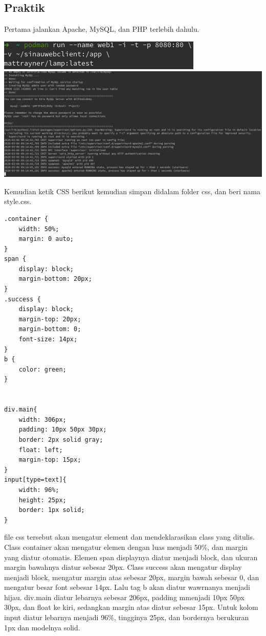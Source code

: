 \documentclass[a4paper,12pt]{article}
\begin{document}
\subsection{Praktik}
Pertama jalankan Apache, MySQL, dan PHP terlebih dahulu.
\begin{center}
    \includegraphics[scale=.8]{1.png}\\[4ex]
    \includegraphics[width=\linewidth]{2.png} 
\end{center}
Kemudian ketik CSS berikut kemudian simpan didalam folder css, dan beri nama style.css.
\begin{lstlisting}[style=htmlcssjs]
.container {
    width: 50%;
    margin: 0 auto;
}
span {
    display: block;
    margin-bottom: 20px;
}
.success {
    display: block;
    margin-top: 20px;
    margin-bottom: 0;
    font-size: 14px;
}
b {
    color: green;
}


div.main{
    width: 306px;
    padding: 10px 50px 30px;
    border: 2px solid gray;
    float: left;
    margin-top: 15px;
}
input[type=text]{
    width: 96%;
    height: 25px;
    border: 1px solid;
}
\end{lstlisting}
\newline
file css tersebut akan mengatur element dan mendeklarasikan class yang ditulis. Class container akan mengatur elemen dengan luas menjadi 50\%, dan margin yang diatur otomatis.
Elemen span displaynya diatur menjadi block, dan ukuran margin bawahnya diatur sebesar 20px.
Class success akan mengatur display menjadi block, mengatur margin atas sebesar 20px, margin bawah sebesar 0, dan mengatur besar font sebesar 14px.
Lalu tag b akan diatur wawrnanya menjadi hijau.
div.main diatur lebarnya sebesar 206px, padding mmenjadi 10px 50px 30px, dan float ke kiri, sedangkan margin atas diatur sebesar 15px.
Untuk kolom input diatur lebarnya menjadi 96\%, tingginya 25px, dan bordernya berukuran 1px dan modelnya solid.\\[2ex]
\end{document}
